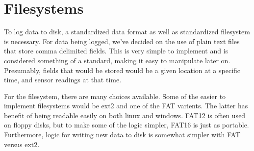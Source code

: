 \documentclass{article}
\begin{document}
\section*{Filesystems}
To log data to disk, a standardized data format as well as standardized
filesystem is necessary.  For data being logged, we've decided on the use of
plain text files that store comma delimited fields.  This is very simple to
implement and is considered something of a standard, making it easy to
manipulate later on. Presumably, fields that would be stored would be a given
location at a specific time, and sensor readings at that time.

For the filesystem, there are many choices available.  Some of the easier to
implement filesystems would be ext2 and one of the FAT varients.  The latter has
benefit of being readable easily on both linux and windows.  FAT12 is often used
on floppy disks, but to make some of the logic simpler, FAT16 is just as
portable.  Furthermore, logic for writing new data to disk is somewhat simpler
with FAT versus ext2.

\nocite{*}
{}

\end{document}
